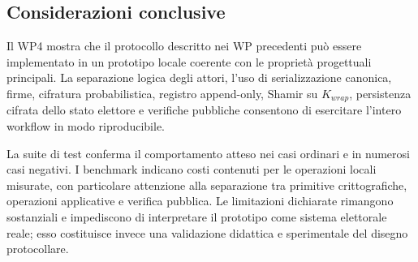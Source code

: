 \subsection{Considerazioni conclusive}
\label{wp4:conclusioni}

Il WP4 mostra che il protocollo descritto nei WP precedenti pu\`o essere implementato in un prototipo locale coerente con le propriet\`a progettuali principali. La separazione logica degli attori, l'uso di serializzazione canonica, firme, cifratura probabilistica, registro append-only, Shamir su $K_{\mathit{wrap}}$, persistenza cifrata dello stato elettore e verifiche pubbliche consentono di esercitare l'intero workflow in modo riproducibile.

La suite di test conferma il comportamento atteso nei casi ordinari e in numerosi casi negativi. I benchmark indicano costi contenuti per le operazioni locali misurate, con particolare attenzione alla separazione tra primitive crittografiche, operazioni applicative e verifica pubblica. Le limitazioni dichiarate rimangono sostanziali e impediscono di interpretare il prototipo come sistema elettorale reale; esso costituisce invece una validazione didattica e sperimentale del disegno protocollare.
